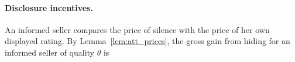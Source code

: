 \paragraph{Disclosure incentives.}
An informed seller compares the price of silence with the price of her own displayed rating. By Lemma~\ref{lem:att_prices}, the gross gain from hiding for an informed seller of quality $\theta$ is
